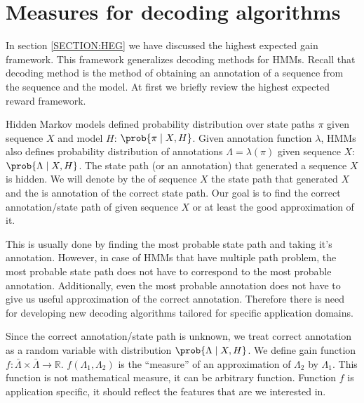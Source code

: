 \section{Measures for decoding algorithms}


In section \ref{SECTION:HEG} we have discussed the highest expected gain
framework. This framework generalizes decoding methods for HMMs. Recall that
decoding method is the method of obtaining an annotation of a sequence from the
sequence and the model. At first we briefly review the highest expected reward
framework.

Hidden Markov models defined probability distribution over state paths $\pi$
given sequence $X$ and model $H$: $\prob{\pi\mid X,H}$. Given annotation
function $\lambda$, HMMs also defines probability distribution of annotations
$\Lambda=\lambda(\pi)$ given sequence $X$: $\prob{\Lambda\mid X,H}$.  The state
path (or an annotation) that generated a sequence $X$ is hidden.
We will denote by
the  of sequence $X$ the state path that
generated $X$ and the  is annotation of the
correct state path. Our goal is to find the correct annotation/state path of
given sequence $X$ or at least the good approximation of it.

This is usually done by finding the most probable state path and taking it's
annotation. However, in case of HMMs that have multiple path problem, 
the most probable state path does not have to correspond to the most probable
annotation. Additionally, even the most probable annotation does not have to
give us useful approximation of the correct annotation. Therefore there is need
for developing new decoding algorithms tailored for specific application
domains.


Since the correct annotation/state path is unknown, we treat correct annotation
as a random variable with distribution $\prob{\Lambda\mid X,H}$. We define gain
function $f:\bar{\Lambda}\times\bar{\Lambda}\to \mathbb{R}$.
$f(\Lambda_1,\Lambda_2)$ is the ``measure'' of an approximation of $\Lambda_2$
by $\Lambda_1$. This function is not mathematical measure, it can be arbitrary
function. Function $f$ is application specific, it should reflect the features
that are we interested in.

